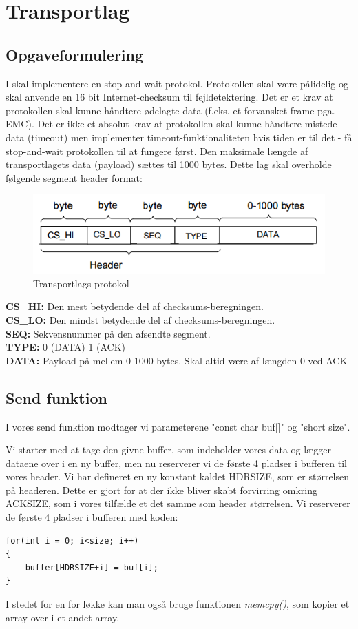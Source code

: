 \chapter{Transportlag}

\section{Opgaveformulering}
I skal implementere en stop-and-wait protokol. Protokollen skal være pålidelig og skal anvende en 16 bit Internet-checksum til
fejldetektering. Det er et krav at protokollen skal kunne håndtere ødelagte data (f.eks. et forvansket frame pga. EMC). Det er ikke et absolut krav at protokollen skal kunne håndtere mistede data (timeout) men implementer timeout-funktionaliteten hvis tiden er til det - få stop-and-wait protokollen til at fungere først. Den maksimale længde af transportlagets data (payload) sættes til 1000 bytes. Dette lag skal overholde følgende segment header format:

\begin{figure}[htbp]
\centering
\includegraphics[width=1\linewidth]{Subpages/Billeder/Transportlag}
\caption{Transportlags protokol}
\label{fig:Transportlag}
\end{figure}

\textbf{CS\_HI:} Den mest betydende del af checksums-beregningen.\\
\textbf{CS\_LO:} Den mindst betydende del af checksums-beregningen.\\
\textbf{SEQ:} Sekvensnummer på den afsendte segment.\\
\textbf{TYPE:} 0 (DATA) 1 (ACK)\\
\textbf{DATA:} Payload på mellem 0-1000 bytes. Skal altid være af længden 0 ved ACK


\section{Send funktion}
I vores send funktion modtager vi parameterene "const char buf[]" og "short size". 

Vi starter med at tage den givne buffer, som indeholder vores data og lægger dataene over i en ny buffer, men nu reserverer vi de første 4 pladser i bufferen til vores header. 
Vi har defineret en ny konstant kaldet HDRSIZE, som er størrelsen på headeren. Dette er gjort for at der ikke bliver skabt forvirring omkring ACKSIZE, som i vores tilfælde et det samme som header størrelsen. 
Vi reserverer de første 4 pladser i bufferen med koden:
\begin{lstlisting}
for(int i = 0; i<size; i++)
{
	buffer[HDRSIZE+i] = buf[i];
}
\end{lstlisting}
I stedet for en for løkke kan man også bruge funktionen \textit{memcpy()}, som kopier et array over i et andet array.

